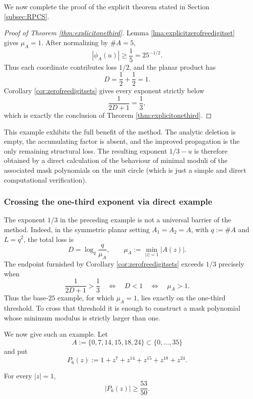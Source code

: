 \documentclass[12pt]{amsart}
\numberwithin{equation}{section}
\begin{document}
We now complete the proof of the explicit theorem stated in Section
\ref{subsec:RPCS}.

\begin{proof}[Proof of Theorem \ref{thm:explicitonethird}]
Lemma \ref{lma:explicitzerofreedigitset} gives $\mu_A=1$.  After normalizing
by $\#A=5$,
\[
 |\phi_A(u)|\geq\frac15=25^{-1/2}.
\]
Thus each coordinate contributes loss $1/2$, and the planar product has
\[
 D=\frac12+\frac12=1.
\]
Corollary \ref{cor:zerofreedigitsets} gives every exponent strictly below
\[
 \frac1{2D+1}=\frac13,
\]
which is exactly the conclusion of Theorem \ref{thm:explicitonethird}.
\end{proof}

This example exhibits the full benefit of the method.  The analytic deletion
is empty, the accumulating factor is absent, and the improved propagation is
the only remaining structural loss.  The resulting exponent $1/3-u$ is
therefore obtained by a direct calculation of the behaviour of minimal moduli of the associated mask polynomials on the unit circle (which is just a simple and direct computational verification).

\subsubsection{Crossing the one-third exponent via direct example}

The exponent $1/3$ in the preceding example is not a universal barrier of
the method.  Indeed, in the symmetric planar setting $A_1=A_2=A$, with
$q:=\#A$ and $L=q^2$, the total loss is
\begin{equation}\label{eq:symmetric-zero-free-loss}
 D=\log_q\frac q{\mu_A},
 \qquad
 \mu_A:=\min_{|z|=1}|A(z)|.
\end{equation}
The endpoint furnished by Corollary \ref{cor:zerofreedigitsets} exceeds
$1/3$ precisely when
\[
 \frac1{2D+1}>\frac13
 \quad\Longleftrightarrow\quad
 D<1
 \quad\Longleftrightarrow\quad
 \mu_A>1.
\]
Thus the base-$25$ example, for which $\mu_A=1$, lies exactly on the
one-third threshold.  To cross that threshold it is enough to construct a
mask polynomial whose minimum modulus is strictly larger than one.

We now give such an example.  Let
\[
 A:=\{0,7,14,15,18,24\}\subset\{0,\ldots,35\}
\]
and put
\[
 P_6(z):=1+z^7+z^{14}+z^{15}+z^{18}+z^{24}.
\]

\begin{lemma}\label{lma:explicitbeyondthird}
For every $|z|=1$,
\begin{equation}\label{eq:base36-minimum-modulus}
 |P_6(z)|\geq\frac{53}{50}.
\end{equation}
\end{lemma}
\end{document}
